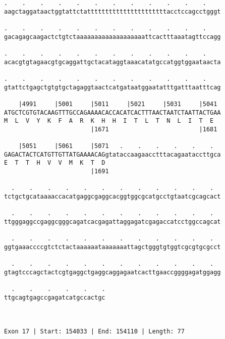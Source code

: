 \documentclass{article}
\begin{document}
\begin{Verbatim}
.    .    .    .    .    .    .    .    .    .    .    .    
aagctaggataactggtattctattttttttttttttttttttttacctccagcctgggt
                                                            
.    .    .    .    .    .    .    .    .    .    .    .    
gacagagcaagactctgtctaaaaaaaaaaaaaaaaaaattcactttaaatagttccagg
                                                            
.    .    .    .    .    .    .    .    .    .    .    .    
acacgtgtagaacgtgcaggattgctacataggtaaacatatgccatggtggaataacta
                                                            
.    .    .    .    .    .    .    .    .    .    .    .    
gtattctgagctgtgtgctagaggtaactcatgataatggaatatttgatttaatttcag
                                                            
    |4991     |5001     |5011     |5021     |5031     |5041 
ATGCTCGTGTACAAGTTTGCCAGAAAACACCACATCACTTTAACTAATCTAATTACTGAA
M  L  V  Y  K  F  A  R  K  H  H  I  T  L  T  N  L  I  T  E  
                        |1671                         |1681 
  
    |5051     |5061     |5071   .    .    .    .    .    .  
GAGACTACTCATGTTGTTATGAAAACAGgtataccaagaacctttacagaataccttgca
E  T  T  H  V  V  M  K  T  D                                
                        |1691                               
  
  .    .    .    .    .    .    .    .    .    .    .    .  
tctgctgcataaaaccacatgaggcgaggcacggtggcgcatgcctgtaatcgcagcact
                                                            
  .    .    .    .    .    .    .    .    .    .    .    .  
ttgggaggccgaggcgggcagatcacgagattaggagatcgagaccatcctggccagcat
                                                            
  .    .    .    .    .    .    .    .    .    .    .    .  
ggtgaaaccccgtctctactaaaaaataaaaaaattagctgggtgtggtcgcgtgcgcct
                                                            
  .    .    .    .    .    .    .    .    .    .    .    .  
gtagtcccagctactcgtgaggctgaggcaggagaatcacttgaaccggggagatggagg
                                                            
  .    .    .    .    .    .
ttgcagtgagccgagatcatgccactgc
                            
                            
 
Exon 17 | Start: 154033 | End: 154110 | Length: 77
 

\end{Verbatim}
\end{document}
